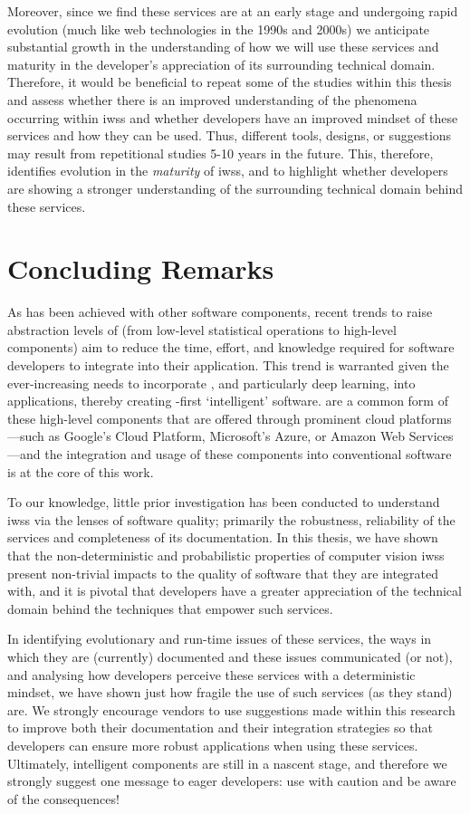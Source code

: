 Moreover, since we find these services are at an early stage and undergoing rapid evolution (much like web technologies in the 1990s and 2000s) we anticipate substantial growth in the understanding of how we will use these services and maturity in the developer's appreciation of its surrounding technical domain. Therefore, it would be beneficial to repeat some of the studies within this thesis and assess whether there is an improved understanding of the phenomena occurring within \glspl{iws} and whether developers have an improved mindset of these services and how they can be used. Thus, different tools, designs, or suggestions may result from repetitional studies 5-10 years in the future. This, therefore, identifies evolution in the \textit{maturity} of \glspl{iws}, and to highlight whether developers are showing a stronger understanding of the surrounding technical domain behind these services.

\section{Concluding Remarks}

As has been achieved with other software components, recent trends to raise abstraction levels of  (from low-level statistical operations to high-level  components) aim to reduce the time, effort, and knowledge required for software developers to integrate  into their application. This trend is warranted given the ever-increasing needs to incorporate , and particularly deep learning, into applications, thereby creating -first `intelligent' software.  are a common form of these high-level  components that are offered through prominent cloud platforms---such as Google's Cloud Platform, Microsoft's Azure, or Amazon Web Services---and the integration and usage of these components into conventional software is at the core of this work.

To our knowledge, little prior investigation has been conducted to understand \glspl{iws} via the lenses of software quality; primarily the robustness, reliability of the services and completeness of its documentation. In this thesis, we have shown that the non-deterministic and probabilistic properties of computer vision \glspl{iws} present non-trivial impacts to the quality of software that they are integrated with, and it is pivotal that developers have a greater appreciation of the technical domain behind the  techniques that empower such services. 

In identifying evolutionary and run-time issues of these services, the ways in which they are (currently) documented and these issues communicated (or not), and analysing how developers perceive these services with a deterministic mindset, we have shown just how fragile the use of such services (as they stand) are. We strongly encourage vendors to use suggestions made within this research to improve both their documentation and their integration strategies so that developers can ensure more robust applications when using these services. Ultimately, intelligent  components are still in a nascent stage, and therefore we strongly suggest one message to eager developers: use with caution and be aware of the consequences!
